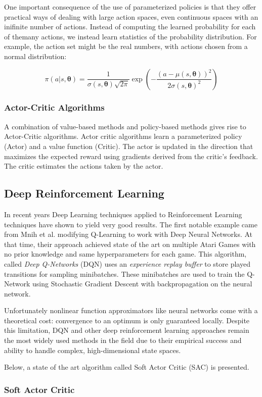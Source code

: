 One important consequence of the use of parameterized policies is that they offer practical ways of dealing with large action spaces,
even continuous spaces with an inifinite number of actions. Instead of computing the learned probability for each of themany actions,
we instead learn statistics of the probability distribution. For example, the action set might be the real numbers, with actions chosen
from a normal distribution:

\begin{equation*}
    \pi(a|s,\bm{\theta}) = \frac{1}{\sigma(s, \bm{\theta})\sqrt{2 \pi}}\exp\left(-\frac{(a - \mu(s, \bm{\theta}))^2}{2\sigma(s,\bm{\theta})^2}\right)
\end{equation*}


\subsubsection{Actor-Critic Algorithms}
A combination of value-based methods and policy-based methods gives rise to Actor-Critic algorithms. Actor critic algorithms
learn a parameterized policy (Actor) and a value function (Critic).
The actor is updated in the direction that maximizes the expected reward using gradients derived from the critic's feedback.
The critic estimates the actions taken by the actor.

\subsection{Deep Reinforcement Learning}
In recent years Deep Learning techniques applied to Reinforcement Learning techniques have shown to yield very good results.
The first notable example came from Mnih et al. \cite{DQN} modifying Q-Learning to work with Deep Neural Networks.
At that time, their approach achieved state of the art on multiple Atari Games with no prior knowledge and same hyperparameters for each game. This algorithm, called
\textit{Deep Q-Networks} (DQN) uses an \textit{experience replay buffer} to store played transitions for sampling minibatches.
These minibatches are used to train the Q-Network using Stochastic Gradient Descent with backpropagation on the neural network.

Unfortunately nonlinear function approximators like neural networks come with a theoretical cost:
convergence to an optimum is only guaranteed locally. Despite this limitation, DQN and other deep reinforcement learning approaches remain the most widely used methods in the field 
due to their empirical success and ability to handle complex, high-dimensional state spaces.


Below, a state of the art algorithm called Soft Actor Critic (SAC) \cite{SAC, SAC_modified} is presented.

\subsubsection{Soft Actor Critic}











